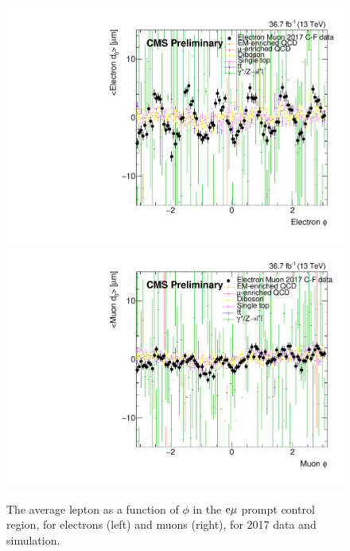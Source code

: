 \begin{figure}[hbtp]
\centering
\includegraphics[scale=0.3]{figures/corrections/d0_smearing/emu_2017/electronD0_50um_vs_electronPhi_pfx.pdf}
\includegraphics[scale=0.3]{figures/corrections/d0_smearing/emu_2017/muonD0_50um_vs_muonPhi_pfx.pdf}
\caption{The average lepton \ad as a function of $\phi$ in the $\mathrm{e}{\mu}$ prompt control region, for electrons (left) and muons (right), for 2017 data and simulation.}
\label{uncorrected_avg_d0_vs_phi}
\end{figure}

